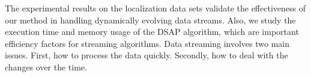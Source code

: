 The experimental results on the localization data sets validate the effectiveness of our method in handling
dynamically evolving data streams. Also, we study the execution time and memory usage of the DSAP algorithm, which are important efficiency factors for streaming algorithms.
Data streaming involves two main issues. First, how to process the data quickly.
Secondly, how to deal with the changes over the time.













